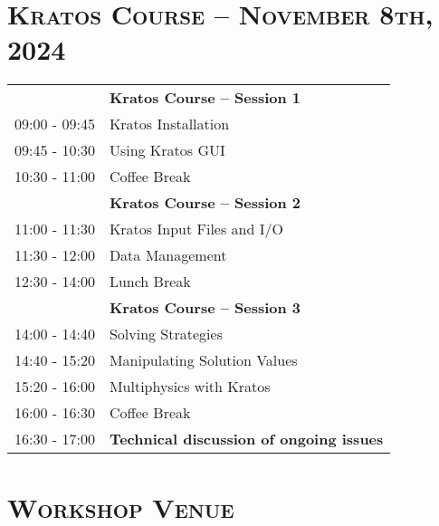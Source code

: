 \documentclass{article}
\begin{document}
\newpage
\section*{\centering \textsc{Kratos Course -- November 8th, 2024}}

\begin{table}[h]\centering
   \begin{tabularx}{0.85\textwidth}{r|X}
      \toprule%
                    & {\large \textbf{Kratos Course -- Session 1}} \\%
      09:00 - 09:45 & Kratos Installation \\%
      09:45 - 10:30 & Using Kratos GUI \\%
      \midrule%
      \rowcolor{SeaGreen3!5!} 10:30 - 11:00 & Coffee Break \\%
      \midrule%
                    & {\large \textbf{Kratos Course -- Session 2}} \\%
      11:00 - 11:30 & Kratos Input Files and I/O \\%
      11:30 - 12:00 & Data Management \\%
      \midrule%
      \rowcolor{SeaGreen3!5!} 12:30 - 14:00 & Lunch Break \\%
      \midrule%
                    & {\large \textbf{Kratos Course -- Session 3}} \\%
      14:00 - 14:40 & Solving Strategies \\%
      14:40 - 15:20 & Manipulating Solution Values \\%
      15:20 - 16:00 & Multiphysics with Kratos \\%
      \midrule%
      \rowcolor{SeaGreen3!5!} 16:00 - 16:30 & Coffee Break \\%
      \midrule%
      16:30 - 17:00 & {\large \textbf{Technical discussion of ongoing issues}} \\%
      \bottomrule
   \end{tabularx}
\end{table}

\newpage
\section*{\centering \textsc{Workshop Venue}}
\end{document}

